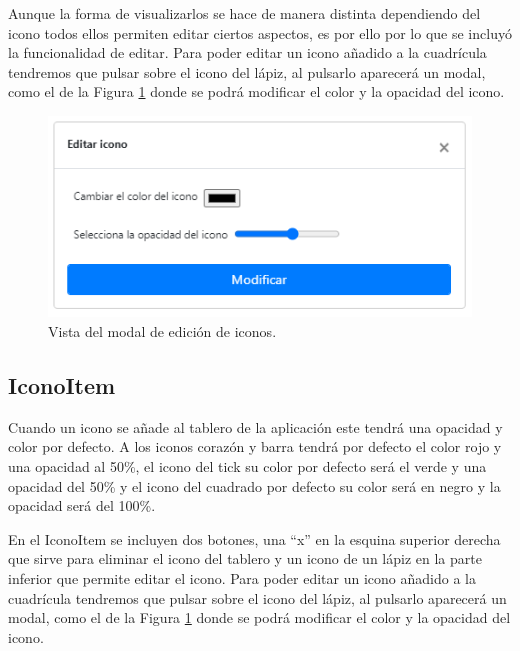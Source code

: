  
Aunque la forma de visualizarlos se hace de manera distinta dependiendo del icono todos ellos permiten editar ciertos aspectos, es por ello por lo que se incluyó la funcionalidad de editar. Para poder editar un icono añadido a la cuadrícula tendremos que pulsar sobre el icono del lápiz, al pulsarlo aparecerá un modal, como el de la Figura \ref{fig:modalpictoitem} donde se podrá modificar el color y la opacidad del icono.  

\begin{figure}[h!]
	\centering
	\includegraphics[width=0.7\linewidth]{Imagenes/Bitmap/modalPictoItem}
	\caption{Vista del modal de edición de iconos.}
	\label{fig:modalpictoitem}
\end{figure}

\subsection{IconoItem}

Cuando un icono se añade al tablero de la aplicación este tendrá una opacidad y color por defecto. A los iconos corazón y barra tendrá por defecto el color rojo y una opacidad al 50\%, el icono del tick su color por defecto será el verde y una opacidad del 50\% y el icono del cuadrado por defecto su color será en negro y la opacidad será del 100\%.

En el IconoItem se incluyen dos botones, una “x” en la esquina superior derecha que sirve para eliminar el icono del tablero y un icono de un lápiz en la parte inferior que permite editar el icono. Para poder editar un icono añadido a la cuadrícula tendremos que pulsar sobre el icono del lápiz, al pulsarlo aparecerá un modal, como el de la Figura \ref{fig:modalpictoitem} donde se podrá modificar el color y la opacidad del icono.

